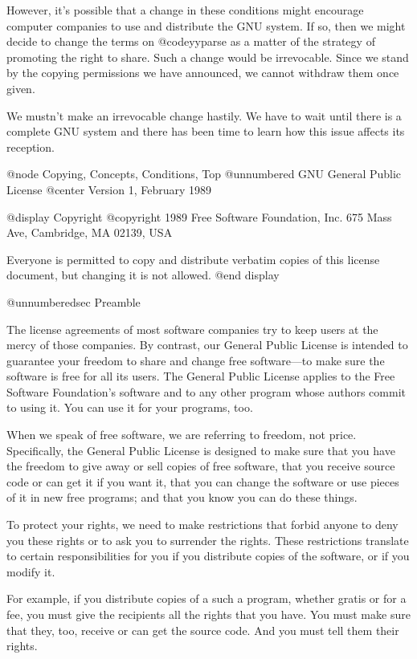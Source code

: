However, it's possible that a change in these conditions might encourage
computer companies to use and distribute the GNU system.  If so, then we
might decide to change the terms on @code{yyparse} as a matter of the
strategy of promoting the right to share.  Such a change would be
irrevocable.  Since we stand by the copying permissions we have announced,
we cannot withdraw them once given.

We mustn't make an irrevocable change hastily.  We have to wait until there
is a complete GNU system and there has been time to learn how this issue
affects its reception.

@node Copying, Concepts, Conditions, Top
@unnumbered GNU General Public License
@center Version 1, February 1989

@display
Copyright @copyright{} 1989 Free Software Foundation, Inc.
675 Mass Ave, Cambridge, MA 02139, USA

Everyone is permitted to copy and distribute verbatim copies
of this license document, but changing it is not allowed.
@end display

@unnumberedsec Preamble

  The license agreements of most software companies try to keep users
at the mercy of those companies.  By contrast, our General Public
License is intended to guarantee your freedom to share and change free
software---to make sure the software is free for all its users.  The
General Public License applies to the Free Software Foundation's
software and to any other program whose authors commit to using it.
You can use it for your programs, too.

  When we speak of free software, we are referring to freedom, not
price.  Specifically, the General Public License is designed to make
sure that you have the freedom to give away or sell copies of free
software, that you receive source code or can get it if you want it,
that you can change the software or use pieces of it in new free
programs; and that you know you can do these things.

  To protect your rights, we need to make restrictions that forbid
anyone to deny you these rights or to ask you to surrender the rights.
These restrictions translate to certain responsibilities for you if you
distribute copies of the software, or if you modify it.

  For example, if you distribute copies of a such a program, whether
gratis or for a fee, you must give the recipients all the rights that
you have.  You must make sure that they, too, receive or can get the
source code.  And you must tell them their rights.

